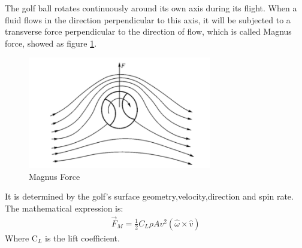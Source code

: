 The golf ball rotates continuously around its own axis during its flight. When a fluid flows in the direction perpendicular to this axis, it will be subjected to a transverse force perpendicular to the direction of flow, which is called Magnus force, showed as figure \ref{fig:magnus}.
\begin{figure}[H]
    \centering
    \includegraphics[width=8cm]{figure/Magnus.png}
    \caption{Magnus Force}
    \label{fig:magnus}
\end{figure}
It is determined by the golf's surface geometry,velocity,direction and spin rate. The mathematical expression is:
\begin{align}
    \vec{F}_{M}=\frac{1}{2} C_{L} \rho A v^{2}(\hat{\omega} \times \hat{v})
\end{align}
Where C$_L$ is the lift coefficient.

